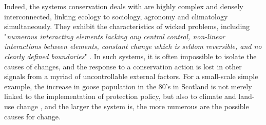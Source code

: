 \documentclass[12pt,a4paper]{article}
\begin{document}
Indeed, the systems conservation deals with are highly complex and densely interconnected, linking ecology to sociology, agronomy and climatology simultaneously. %
They exhibit the characteristics of wicked problems, including "\textit{numerous interacting elements lacking any central control, non-linear interactions between elements, constant change which is seldom reversible, and no clearly defined boundaries}" \citep{game2013conservation}.
In such systems, it is often impossible to isolate the causes of changes, and the response to a conservation action is lost in other signals from a myriad of uncontrollable external factors.
For a small-scale simple example, the increase in goose population in the 80's in Scotland is not merely linked to the implementation of protection policy, but also to climate and land-use change \citep{mason2017changing}, and the larger the system is, the more numerous are the possible causes for change.
\end{document}
